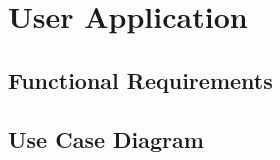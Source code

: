 \section{User Application}

\subsection{Functional Requirements}

	\begin{flushleft}


	\end{flushleft}

\subsection{Use Case Diagram}
	\begin{center}
	\end{center}
